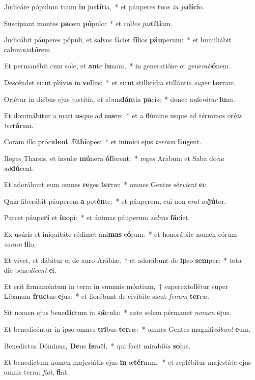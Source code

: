 \item Judicáre pópulum tuum \textbf{in} jus\textbf{tí}tia,~* et páuperes tuos \textit{in} \textit{ju}\textbf{dí}\textbf{ci}o.
\item Suscípiant montes \textbf{pa}cem \textbf{pó}pulo:~* et col\textit{les} \textit{jus}\textbf{tí}\textbf{ti}am.
\item Judicábit páuperes pópuli, et salvos fáciet \textbf{fí}lios \textbf{páu}perum:~* et humiliábit calum\textit{ni}\textit{a}\textbf{tó}rem.
\item Et permanébit cum sole, et \textbf{an}te \textbf{lu}nam,~* in generatióne et gene\textit{ra}\textit{ti}\textbf{ó}nem.
\item Descéndet sicut plúvi\textbf{a} in \textbf{vel}lus:~* et sicut stillicídia stillántia \textit{su}\textit{per} \textbf{ter}ram.
\item Oriétur in diébus ejus justítia, et abun\textbf{dán}tia \textbf{pa}cis:~* donec aufe\textit{rá}\textit{tur} \textbf{lu}na.
\item Et dominábitur a mari \textbf{us}que ad \textbf{ma}re:~* et a flúmine usque ad términos or\textit{bis} \textit{ter}\textbf{rá}rum.
\item Coram illo próci\textbf{dent} Æ\textbf{thí}opes:~* et inimíci ejus \textit{ter}\textit{ram} \textbf{lin}gent.
\item Reges Tharsis, et ínsulæ \textbf{mú}nera \textbf{óf}ferent:~* reges Arabum et Saba do\textit{na} \textit{ad}\textbf{dú}cent.
\item Et adorábunt eum omnes \textbf{re}ges \textbf{ter}ræ:~* omnes Gentes sér\textit{vi}\textit{ent} \textbf{e}i:
\item Quia liberábit páuperem \textbf{a} pot\textbf{én}te:~* et páuperem, cui non e\textit{rat} \textit{ad}\textbf{jú}tor.
\item Parcet páupe\textbf{ri} et \textbf{ín}opi:~* et ánimas páuperum \textit{sal}\textit{vas} \textbf{fá}\textbf{ci}et.
\item Ex usúris et iniquitáte rédimet áni\textbf{mas} e\textbf{ó}rum:~* et honorábile nomen eórum \textit{co}\textit{ram} \textbf{il}lo.
\item Et vivet, et dábitur ei de auro Arábiæ,~† et adorábunt de \textbf{ip}so \textbf{sem}per:~* tota die bene\textit{dí}\textit{cent} \textbf{e}i.
\item Et erit firmaméntum in terra in summis móntium,~† superextollétur super Líbanum \textbf{fruc}tus \textbf{e}jus:~* et florébunt de civitáte sicut \textit{fe}\textit{num} \textbf{ter}ræ.
\item Sit nomen ejus bene\textbf{díc}tum in \textbf{sǽ}cula:~* ante solem pérmanet \textit{no}\textit{men} \textbf{e}jus.
\item Et benedicéntur in ipso omnes \textbf{tri}bus \textbf{ter}ræ:~* omnes Gentes magnifi\textit{cá}\textit{bunt} \textbf{e}um.
\item Benedíctus Dóminus, \textbf{De}us \textbf{Is}raël,~* qui facit mirabí\textit{li}\textit{a} \textbf{so}lus.
\item Et benedíctum nomen majestátis ejus \textbf{in} æ\textbf{tér}num:~* et replébitur majestáte ejus omnis terra: \textit{fi}\textit{at}, \textbf{fi}at.
